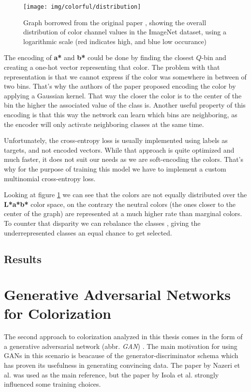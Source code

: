 \begin{figure}[!ht]
	\centering
	\texttt{[image: img/colorful/distribution]}
    \caption{Graph borrowed from the original paper \citep{zhang2016colorful}, 
	showing the overall distribution of color channel values in the ImageNet
	dataset, using a logarithmic scale (red indicates high, and blue low occurance)}
	\label{fig:distribution}
\end{figure}

The encoding of \textbf{a*} and \textbf{b*} could be done by finding the 
closest $Q$-bin and creating a one-hot vector representing that color. The 
problem with that representation is that we cannot express if the color
was somewhere in between of two bins. That's why the authors of the 
paper proposed encoding the color by applying a Gaussian kernel. That way
the closer the color is to the center of the bin the higher the associated
value of the class is. Another useful property of this encoding is that this way
the network can learn which bins are neighboring, as the encoder will only 
activate neighboring classes at the same time.

Unfortunately, the cross-entropy loss is usually implemented using labels as targets,
and not encoded vectors. While that approach is quite optimized and much faster, 
it does not suit our needs as we are soft-encoding the colors. That's why for 
the purpose of training this model we have to implement a custom multinomial 
cross-entropy loss.

Looking at figure \ref{fig:distribution} we can see that the colors are not 
equally distributed over the \textbf{L*a*b*} color space, on the contrary
the neutral colors (the ones closer to the center of the graph) are represented
at a much higher rate than marginal colors. To counter that disparity we can
rebalance the classes \citep{tantithamthavorn2020rebalancing}, giving the 
underrepresented classes an equal chance to get selected.

\subsection{Results}

\clearpage
\section{Generative Adversarial Networks for Colorization}
\label{sec:gan}

The second approach to colorization analyzed in this thesis comes in the form
of a generative adversarial network (abbr. \textit{GAN}) \citep{goodfellow2014generative}.
The main motivation for using GANs in this scenario is beacause of the 
generator-discriminator schema which has proven its usefulness in generating 
convincing data. The paper by Nazeri et al. was used as the main reference, 
but the paper by Isola et al. strongly influenced some training choices.


